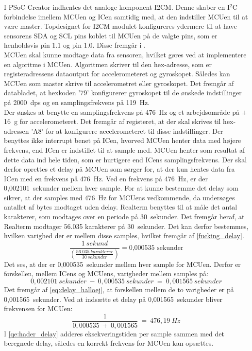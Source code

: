 I PSoC Creator indhentes det analoge komponent I2CM. Denne skaber en I$^2$C forbindelse imellem MCUen og ICen samtidig med, at den indstiller MCUen til at være master. Topdesignet for I2CM modulet konfigureres ydermere til at have sensorens SDA og SCL pins koblet til MCUen på de valgte pins, som er henholdsvis pin 1.1 og pin 1.0. Disse fremgår i .\\
MCUen skal kunne modtage data fra sensoren, hvilket gøres ved at implementere en algoritme i MCUen. Algoritmen skriver til den hex-adresse, som er registeradressens dataoutput for accelerometeret og gyroskopet. Således kan MCUen som master skrive til accelerometret eller gyroskopet. Det fremgår af databladet, at hexkoden '79' konfigurerer gyroskopet til de ønskede indstillinger på 2000~dps og en samplingsfrekvens på 119~Hz.~\citep{STMicroelectronics2016} \\
Der ønskes at benytte en samplingsfrekvens på 476~Hz og et arbejdsområde på $\pm$16~g for accelerometeret. Det fremgår af registeret, at der skal skrives til hex-adressen 'A8' for at konfigurere accelerometeret til disse indstillinger. Der benyttes ikke interrupt benet på ICen, hvorved MCUen henter data med højere frekvens, end ICen er indstillet til at sample med. MCUen henter som resultat af dette data ind hele tiden, som er hurtigere end ICens samplingsfrekvens. Der skal derfor oprettes et delay på MCUen som sørger for, at der kun hentes data fra ICen med en frekvens på 476~Hz. Ved en frekvens på 476~Hz, er der 0,002101~sekunder mellem hver sample. For at kunne bestemme det delay som sikrer, at der samples med 476~Hz for MCUens vedkommende, da undersøges antallet af bytes modtaget uden delay. Realterm benyttes til at måle det antal karakterer, som modtages over en periode på 30~sekunder. Det fremgår heraf, at Realterm modtager 56.035 karakterer på 30~sekunder. Det kan derfor bestemmes, hvilken varighed der er mellem disse samples, hvilket fremgår af \eqref{fucking_delay}.
\begin{equation}\label{fucking_delay}
\frac{1~sekund}{\left(\frac{56.035~karakterer}{30~sekunder}\right)} = \text{0,000535~sekunder}
\end{equation} 
Det ses, at der er 0,000535~sekunder mellem hver sample for MCUen. Derfor er forskellen, mellem ICens og MCUens, varigheder mellem samples på:
\begin{equation}\label{eq:delay_halloej}
0,002101~sekunder~-~0,000535~sekunder~=~0,001565~sekunder
\end{equation} 
Det fremgår af \eqref{eq:delay_halloej}, at forskellen mellem de to varigheder er på 0,001565~sekunder. Ved at indsætte et delay på 0,001565~sekunder bliver frekvensen for MCUen:
\begin{equation}\label{qe:hader_delay}
\frac{1}{0,000535~+~0,001565}~=~476,19~Hz
\end{equation}
I \eqref{qe:hader_delay} adderes eksekveringstiden per sample sammen med det beregnede delay, således en korrekt frekvens for MCUen kan opsættes. 

